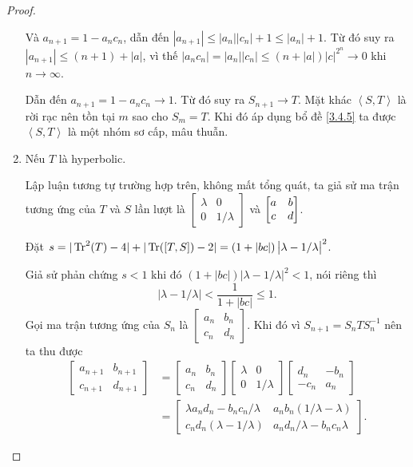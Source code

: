 \begin{proof}
\begin{enumerate}
        Và $a_{n+1}  = 1-a_nc_n$, dẫn đến $|a_{n+1}| \leq |a_n||c_n|+1\leq |a_n| + 1$. Từ đó suy ra $|a_{n+1}| \leq (n+1) + |a|$, vì thế $|a_nc_n| =  |a_n||c_n| \leq (n+|a|)|c|^{2^n} \to 0$ khi $n \to \infty$.

        Dẫn đến $a_{n+1} = 1 - a_nc_n \to 1$. Từ đó suy ra $S_{n+1}\to T$. Mặt khác $\left<S,T\right>$ là rời rạc nên tồn tại $m$ sao cho $S_m = T$. Khi đó áp dụng bổ đề \ref{3.4.5} ta được $\left<S,T\right>$ là một nhóm sơ cấp, mâu thuẫn.

        \item Nếu $T$ là hyperbolic. 

        Lập luận tương tự trường hợp trên, không mất tổng quát, ta giả sử ma trận tương ứng của $T$ và $S$ lần lượt là $\begin{bmatrix}
            \lambda & 0\\
            0 & 1/\lambda
        \end{bmatrix}$ và $\begin{bmatrix} a & b \\ c & d \\ \end{bmatrix}$.

        Đặt $s =|\operatorname{Tr}^2(T)-4|+|\operatorname{Tr}([T,S])-2| = (1+|bc|)\left|\lambda - 1/\lambda\right|^2 $.

        Giả sử phản chứng $s < 1$ khi đó $(1+|bc|)\left|\lambda - 1/\lambda\right|^2 < 1$, nói riêng thì \[\left|\lambda - 1/\lambda\right| < \dfrac{1}{1+|bc|}\leq 1.\]
        Gọi ma trận tương ứng của $S_n$ là 
        $\begin{bmatrix}
            a_n & b_n\\
            c_n & d_n
        \end{bmatrix}$. 
        Khi đó vì $S_{n+1} = S_nTS_n^{-1}$ nên ta thu được
        \begin{align*}
        \begin{bmatrix}
            a_{n+1} & b_{n+1}\\
            c_{n+1} & d_{n+1}
        \end{bmatrix} &= \begin{bmatrix}
            a_n & b_n\\
            c_n & d_n
        \end{bmatrix}\begin{bmatrix}
            \lambda & 0\\
            0 & 1/\lambda
        \end{bmatrix}\begin{bmatrix}
            d_n & -b_n\\
            -c_n & a_n
        \end{bmatrix} \\
        &= \begin{bmatrix}
            \lambda a_nd_n - b_nc_n/\lambda & a_nb_n(1/\lambda - \lambda)\\
            c_nd_n(\lambda  - 1/\lambda) & a_nd_n/\lambda - b_nc_n\lambda
        \end{bmatrix}.
        \end{align*}


\end{enumerate}
\end{proof}
